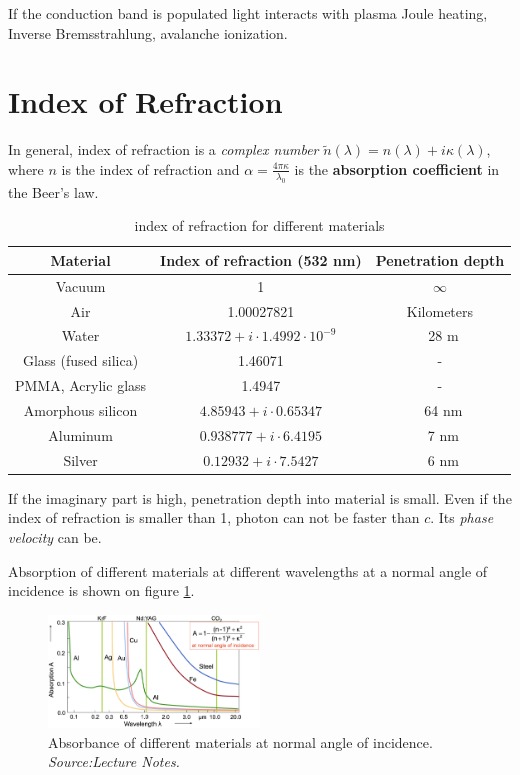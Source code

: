 If the conduction band is populated light interacts with plasma \pd Joule heating, Inverse Bremsstrahlung, avalanche ionization. 

\section{Index of Refraction}
In general, index of refraction is a \textit{complex number} $\tilde{n}(\lambda) = n(\lambda) + i \kappa(\lambda)$, where $n$ is the index of refraction and $\alpha = \frac{4\pi \kappa}{\lambda_0}$ 
is the \textbf{absorption coefficient} in the Beer's law. 

\begin{table}[h!]
    \centering
    \begin{tabular}{|c|c|c|}
        \hline
        Material & Index of refraction (532 nm) & Penetration depth \\
        \hline
        Vacuum & 1 & $\infty$  \\
        Air & 1.00027821 & Kilometers \\
        Water & $1.33372 + i \cdot 1.4992 \cdot 10^{-9}$ & ~28 m \\
        Glass (fused silica) & 1.46071 &-  \\
        PMMA, Acrylic glass & 1.4947 & - \\
        Amorphous silicon & $4.85943 + i \cdot 0.65347$ & ~64 nm \\
        Aluminum & $0.938777 + i \cdot 6.4195$ & ~7 nm \\
        Silver & $0.12932 + i \cdot 7.5427$ & ~6 nm \\
        \hline
    \end{tabular}
    \caption{index of refraction for different materials}
    \label{tab:cri}
\end{table}
If the imaginary part is high, penetration depth into material is small. Even if the index of refraction is smaller than 1, photon can not be 
faster than $c$. Its \textit{phase velocity} can be.

Absorption of different materials at different wavelengths at a normal angle of incidence is shown on figure 
\ref{fig:arwl}.
\begin{figure}[h!]
    \centering
    \includegraphics[width=0.5\textwidth]{slike/arwl.png}
    \caption{Absorbance of different materials at normal angle of incidence. \textit{Source:Lecture Notes.}}
    \label{fig:arwl}
\end{figure}

